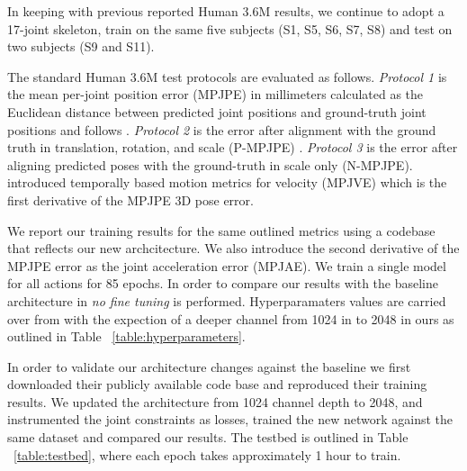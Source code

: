 \documentclass[runningheads]{llncs}
\begin{document}
In keeping with previous reported Human 3.6M \cite{pavlakos2017coarse} \cite{tekin2017learning} \cite{martinez2017simple} \cite{sun2017compositional} \cite{fang2018learning} \cite{pavlakos2018ordinal} \cite{yang20183d} \cite{luvizon20182d} \cite{pavllo20193d} results, we continue to adopt a 17-joint skeleton, train on the same five subjects (S1, S5, S6, S7, S8) and test on two subjects (S9 and S11).

The standard Human 3.6M test protocols are evaluated as follows. \textit{Protocol 1} is the mean per-joint position error (MPJPE) in millimeters calculated as the Euclidean distance between predicted joint positions and ground-truth joint positions and follows \cite{li2015maximum} \cite{tekin2016direct} \cite{zhou2016sparseness} \cite{martinez2017simple} \cite{pavlakos2017coarse} \cite{pavllo20193d}. \textit{Protocol 2} is the error after alignment with the ground truth in translation, rotation, and scale (P-MPJPE) \cite{martinez2017simple} \cite{sun2017compositional} \cite{fang2018learning} \cite{pavlakos2018ordinal} \cite{yang20183d} \cite{rayat2017exploiting}. \textit{Protocol 3} is the error after aligning predicted poses with the ground-truth in scale only (N-MPJPE).  \cite{pavllo20193d} introduced temporally based motion metrics for velocity (MPJVE) which is the first derivative of the MPJPE 3D pose error.

We report our training results for the same outlined metrics using a codebase that reflects our new archcitecture. We also introduce the second derivative of the MPJPE error as the joint acceleration error (MPJAE). We train a single model for all actions for 85 epochs. In order to compare our results with the baseline architecture in \cite{pavllo20193d} \textit{no fine tuning} is performed. Hyperparamaters values are carried over from \cite{pavllo20193d} with the expection of a deeper channel from 1024 in \cite{pavllo20193d} to 2048 in ours as outlined in Table ~\ref{table:hyperparameters}.

In order to validate our architecture changes against the baseline \cite{pavllo20193d} we first downloaded their publicly available code base and reproduced their training results. We updated the architecture from 1024 channel depth to 2048, and instrumented the joint constraints as losses, trained the new network against the same dataset and compared our results. The testbed is outlined in Table ~\ref{table:testbed}, where each epoch takes approximately 1 hour to train.
\end{document}
